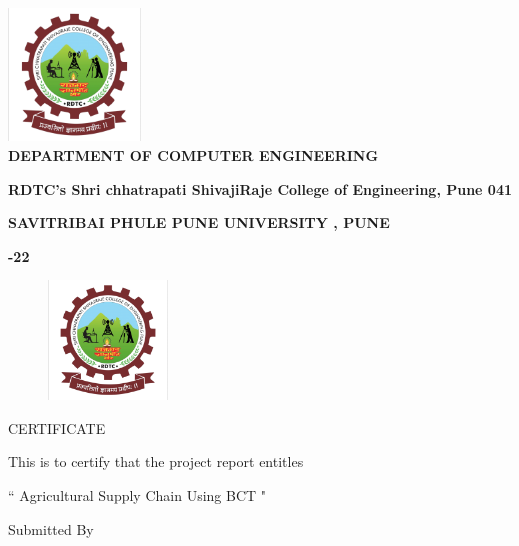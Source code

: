 \documentclass[oneside,a4paper,12pt]{report}
\begin{document}
\begin{center}
\includegraphics[width=100pt]{logo} \\

{\bfseries \fontsize{14}{12} \selectfont DEPARTMENT OF COMPUTER ENGINEERING  \\}
\vspace*{0.5\baselineskip}

{\bfseries \fontsize{12}{12} \selectfont  RDTC's Shri chhatrapati ShivajiRaje College of Engineering, Pune 041\\}
\vspace*{0.5\baselineskip}

{\bfseries \fontsize{12}{12} \selectfont SAVITRIBAI PHULE PUNE UNIVERSITY , PUNE \\}


{\bfseries \fontsize{12}{12} -22 \\}

\end{center}

\newpage
\begin{figure}[ht]
\centering
\includegraphics[width=90pt]{logo}
\end{figure}
{\bfseries \fontsize{14}{12} \selectfont \centerline{CERTIFICATE }
\vspace*{0.5\baselineskip}}

\centerline{This is to certify that the project report entitles }
\vspace*{0.5\baselineskip}

{\bfseries \fontsize{14}{12} \selectfont \centerline{`` Agricultural Supply Chain Using BCT "}}
\vspace*{1\baselineskip}

{\bfseries \fontsize{14}{12} \selectfont \centerline{Submitted By }}
\vspace*{0.5\baselineskip}
\end{document}
